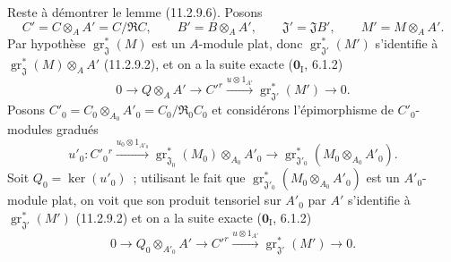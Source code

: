 Reste à démontrer le lemme (11.2.9.6). Posons
\[
C'=C\otimes_AA'=C/\mathfrak RC,\qquad
B'=B\otimes_AA',\qquad \mathfrak J'=\mathfrak JB',\qquad
M'=M\otimes_AA'.
\]
Par hypothèse $\operatorname{gr}_{\mathfrak J}^*(M)$ est un $A$-module plat,
donc $\operatorname{gr}_{\mathfrak J'}^*(M')$ s'identifie à
$\operatorname{gr}_{\mathfrak J}^*(M)\otimes_AA'$ (11.2.9.2), et on a la
suite exacte ($\mathbf 0_{\mathrm I}$, 6.1.2)
\begin{equation}
0\longrightarrow Q\otimes_AA'\longrightarrow C'^{r}
\xrightarrow{u\otimes1_{A'}}\operatorname{gr}_{\mathfrak J'}^*(M')
\longrightarrow0.
\label{IV.11.2.9.7-fr}
\tag{11.2.9.7}
\end{equation}
Posons $C'_0=C_0\otimes_{A_0}A'_0=C_0/\mathfrak R_0C_0$ et considérons
l'épimorphisme de $C'_0$-modules gradués
\[
u'_0:C'_0{}^{r}\xrightarrow{u_0\otimes1_{A'_0}}
\operatorname{gr}_{\mathfrak J_0}^*(M_0)\otimes_{A_0}A'_0
\longrightarrow
\operatorname{gr}_{\mathfrak J'_0}^*(M_0\otimes_{A_0}A'_0).
\]
Soit $Q_0=\ker(u'_0)$~; utilisant le fait que
$\operatorname{gr}_{\mathfrak J'_0}^*(M_0\otimes_{A_0}A'_0)$ est un
$A'_0$-module plat, on voit que son produit tensoriel sur $A'_0$ par $A'$
s'identifie à $\operatorname{gr}_{\mathfrak J'}^*(M')$ (11.2.9.2) et on a la
suite exacte ($\mathbf 0_{\mathrm I}$, 6.1.2)
\begin{equation}
0\longrightarrow Q_0\otimes_{A'_0}A'\longrightarrow C'^{r}
\xrightarrow{u\otimes1_{A'}}\operatorname{gr}_{\mathfrak J'}^*(M')
\longrightarrow0.
\label{IV.11.2.9.8-fr}
\tag{11.2.9.8}
\end{equation}

